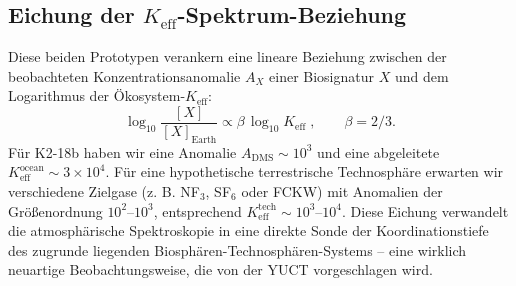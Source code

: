 \documentclass[11pt,a4paper]{article}
\begin{document}
	\subsection{Eichung der \(K_{\mathrm{eff}}\)-Spektrum-Beziehung}
	Diese beiden Prototypen verankern eine lineare Beziehung zwischen der beobachteten Konzentrationsanomalie \(A_X\) einer Biosignatur \(X\) und dem Logarithmus der Ökosystem-\(K_{\mathrm{eff}}\):
	\begin{equation}
		\log_{10} \frac{[X]}{[X]_{\mathrm{Earth}}} \propto
		\beta\,\log_{10} K_{\mathrm{eff}} \; , \qquad \beta = 2/3 .
	\end{equation}
	Für K2-18b haben wir eine Anomalie \(A_{\mathrm{DMS}} \sim 10^3\) und eine abgeleitete \(K_{\mathrm{eff}}^{\mathrm{ocean}} \sim 3\times10^4\). Für eine hypothetische terrestrische Technosphäre erwarten wir verschiedene Zielgase (z. B. NF$_3$, SF$_6$ oder FCKW) mit Anomalien der Größenordnung \(10^2\)–\(10^3\), entsprechend \(K_{\mathrm{eff}}^{\mathrm{tech}} \sim 10^3\)–\(10^4\). Diese Eichung verwandelt die atmosphärische Spektroskopie in eine direkte Sonde der Koordinationstiefe des zugrunde liegenden Biosphären-Technosphären-Systems – eine wirklich neuartige Beobachtungsweise, die von der YUCT vorgeschlagen wird.
	
\end{document}
